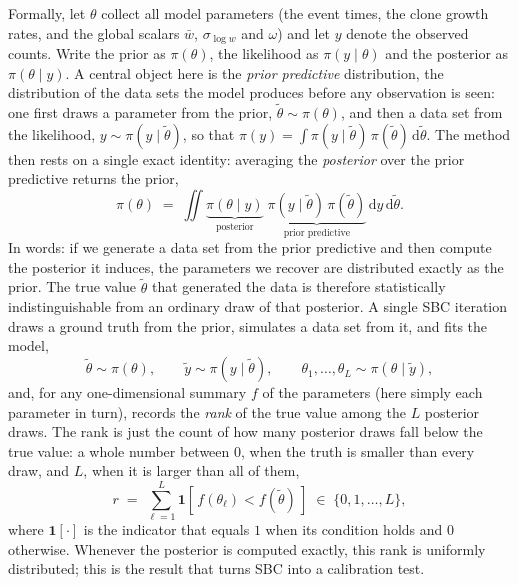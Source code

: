 Formally, let $\theta$ collect all model parameters (the event times, the clone
growth rates, and the global scalars $\bar w$, $\sigma_{\log w}$ and $\omega$) and
let $y$ denote the observed counts. Write the prior as $\pi(\theta)$, the likelihood
as $\pi(y\mid\theta)$ and the posterior as $\pi(\theta\mid y)$. A central object here
is the \emph{prior predictive} distribution, the distribution of the data sets the
model produces before any observation is seen: one first draws a parameter from the
prior, $\tilde\theta\sim\pi(\theta)$, and then a data set from the likelihood,
$y\sim\pi(y\mid\tilde\theta)$, so that
$\pi(y)=\int\pi(y\mid\tilde\theta)\,\pi(\tilde\theta)\,\mathrm{d}\tilde\theta$. The
method then rests on a single exact identity: averaging the \emph{posterior} over the
prior predictive returns the prior,
%
\begin{equation}
  \pi(\theta) \;=\; \iint
  \underbrace{\pi(\theta\mid y)}_{\text{posterior}}\;
  \underbrace{\pi(y\mid\tilde\theta)\,\pi(\tilde\theta)}_{\text{prior predictive}}\,
  \mathrm{d}y\,\mathrm{d}\tilde\theta .
  \label{eq:sbc-selfconsistency}
\end{equation}
%
In words: if we generate a data set from the prior predictive and then compute the
posterior it induces, the parameters we recover are distributed exactly as the prior.
The true value $\tilde\theta$ that generated the data is therefore statistically
indistinguishable from an ordinary draw of that posterior.
%
A single SBC iteration draws a ground truth from the prior, simulates a data set
from it, and fits the model,
%
\begin{equation}
  \tilde\theta \sim \pi(\theta), \qquad
  \tilde y \sim \pi(y\mid\tilde\theta), \qquad
  \theta_1,\dots,\theta_L \sim \pi(\theta\mid\tilde y),
  \label{eq:sbc-generative}
\end{equation}
%
and, for any one-dimensional summary $f$ of the parameters (here simply each
parameter in turn), records the \emph{rank} of the true value among the $L$ posterior
draws. The rank is just the count of how many posterior draws fall below the true
value: a whole number between $0$, when the truth is smaller than every draw, and $L$,
when it is larger than all of them,
%
\begin{equation}
  r \;=\; \sum_{\ell=1}^{L} \mathbf{1}\!\left[\, f(\theta_\ell) < f(\tilde\theta) \,\right]
  \;\in\; \{0,1,\dots,L\},
  \label{eq:sbc-rank}
\end{equation}
%
where $\mathbf{1}[\cdot]$ is the indicator that equals $1$ when its condition holds
and $0$ otherwise.
Whenever the posterior is computed exactly, this rank is uniformly distributed; this
is the result that turns SBC into a calibration test.

